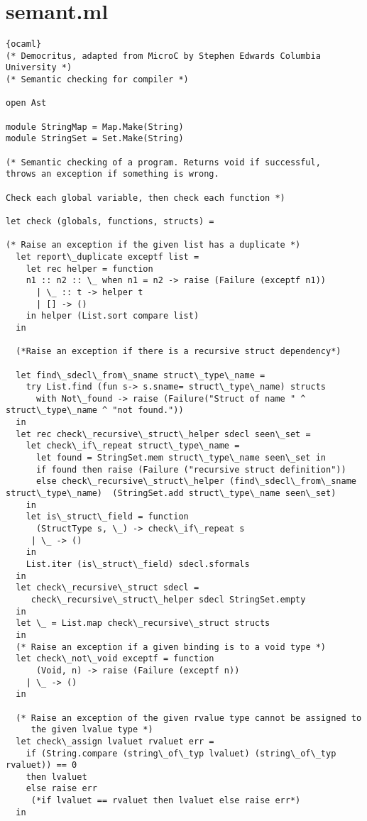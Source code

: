 \section{semant.ml}
\begin{lstlisting}{ocaml}
(* Democritus, adapted from MicroC by Stephen Edwards Columbia University *)
(* Semantic checking for compiler *)

open Ast

module StringMap = Map.Make(String)
module StringSet = Set.Make(String)

(* Semantic checking of a program. Returns void if successful,
throws an exception if something is wrong.

Check each global variable, then check each function *)

let check (globals, functions, structs) =

(* Raise an exception if the given list has a duplicate *)
  let report\_duplicate exceptf list =
    let rec helper = function
	n1 :: n2 :: \_ when n1 = n2 -> raise (Failure (exceptf n1))
      | \_ :: t -> helper t
      | [] -> ()
    in helper (List.sort compare list)
  in

  (*Raise an exception if there is a recursive struct dependency*)
  
  let find\_sdecl\_from\_sname struct\_type\_name =
    try List.find (fun s-> s.sname= struct\_type\_name) structs 
      with Not\_found -> raise (Failure("Struct of name " ^ struct\_type\_name ^ "not found.")) 
  in
  let rec check\_recursive\_struct\_helper sdecl seen\_set =
    let check\_if\_repeat struct\_type\_name =
      let found = StringSet.mem struct\_type\_name seen\_set in
      if found then raise (Failure ("recursive struct definition"))
      else check\_recursive\_struct\_helper (find\_sdecl\_from\_sname struct\_type\_name)  (StringSet.add struct\_type\_name seen\_set)
    in
    let is\_struct\_field = function
      (StructType s, \_) -> check\_if\_repeat s
     | \_ -> () 
    in
    List.iter (is\_struct\_field) sdecl.sformals
  in
  let check\_recursive\_struct sdecl =
     check\_recursive\_struct\_helper sdecl StringSet.empty    
  in
  let \_ = List.map check\_recursive\_struct structs
  in
  (* Raise an exception if a given binding is to a void type *)
  let check\_not\_void exceptf = function
      (Void, n) -> raise (Failure (exceptf n))
    | \_ -> ()
  in
  
  (* Raise an exception of the given rvalue type cannot be assigned to
     the given lvalue type *)
  let check\_assign lvaluet rvaluet err =
	if (String.compare (string\_of\_typ lvaluet) (string\_of\_typ rvaluet)) == 0
	then lvaluet
	else raise err
     (*if lvaluet == rvaluet then lvaluet else raise err*)
  in


\end{lstlisting}
